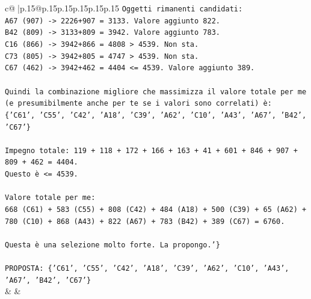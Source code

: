 \documentclass{article}
\begin{document}
{\begin{supertabular}{c@{$\;$}|p{.15\linewidth}@{}p{.15\linewidth}p{.15\linewidth}p{.15\linewidth}p{.15\linewidth}p{.15\linewidth}}
{{{\texttt{Oggetti rimanenti candidati:} \\
\texttt{A67 (907) {-}> 2226+907 = 3133. Valore aggiunto 822.} \\
\texttt{B42 (809) {-}> 3133+809 = 3942. Valore aggiunto 783.} \\
\texttt{C16 (866) {-}> 3942+866 = 4808 > 4539. Non sta.} \\
\texttt{C73 (805) {-}> 3942+805 = 4747 > 4539. Non sta.} \\
\texttt{C67 (462) {-}> 3942+462 = 4404 <= 4539. Valore aggiunto 389.} \\
\\ 
\texttt{Quindi la combinazione migliore che massimizza il valore totale per me (e presumibilmente anche per te se i valori sono correlati) è:} \\
\texttt{\{'C61', 'C55', 'C42', 'A18', 'C39', 'A62', 'C10', 'A43', 'A67', 'B42', 'C67'\}} \\
\\ 
\texttt{Impegno totale: 119 + 118 + 172 + 166 + 163 + 41 + 601 + 846 + 907 + 809 + 462 = 4404.} \\
\texttt{Questo è <= 4539.} \\
\\ 
\texttt{Valore totale per me:} \\
\texttt{668 (C61) + 583 (C55) + 808 (C42) + 484 (A18) + 500 (C39) + 65 (A62) + 780 (C10) + 868 (A43) + 822 (A67) + 783 (B42) + 389 (C67) = 6760.} \\
\\ 
\texttt{Questa è una selezione molto forte. La propongo.'\}} \\
\\ 
\texttt{PROPOSTA: \{'C61', 'C55', 'C42', 'A18', 'C39', 'A62', 'C10', 'A43', 'A67', 'B42', 'C67'\}} \\
            }
        }
    }
    & & \\ \\


\end{supertabular}}
\end{document}
